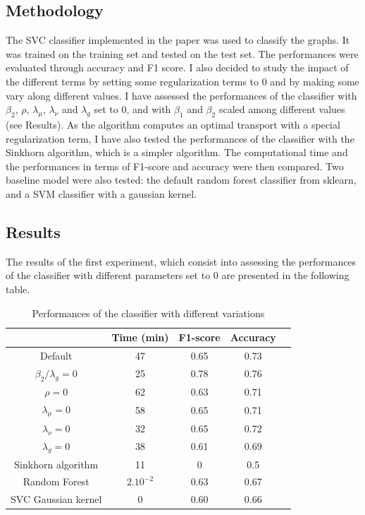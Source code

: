 \documentclass[a4paper,11pt]{article}
\begin{document}
\subsection{Methodology}

The SVC classifier implemented in the paper was used to classify the graphs. 
It was trained on the training set and tested on the test set.
The performances were evaluated through accuracy and F1 score.
I also decided to study the impact of the different terms by setting some regularization terms to 0 and by making some vary along different values. 
I have assessed the performances of the classifier with $\beta_2$, $\rho$, $\lambda_\mu$, $\lambda_\nu$ and $\lambda_g$ set to 0, and with $\beta_1$ and $\beta_2$ scaled among different values (see Results).
As the algorithm computes an optimal transport with a special regularization term, I have also tested the performances of the classifier with the Sinkhorn algorithm, which is a simpler algorithm. 
The computational time and the performances in terms of F1-score and accuracy were then compared. 
Two baseline model were also tested: the default random forest classifier from sklearn, and a SVM classifier with a gaussian kernel.





\subsection{Results}

The results of the first experiment, which consist into assessing the performances of the classifier with different parameters set to 0 are presented in the following table.

\begin{table}[h]
    \centering
    \begin{tabular}{|c|c|c|c|c|}
        \hline
        & Time (min) & F1-score & Accuracy \\
        \hline
        Default & 47 & 0.65 & 0.73 \\
        \hline
        $\beta_2/\lambda_g = 0$ & 25 & 0.78 & 0.76 \\
        \hline
        $\rho = 0$ & 62 & 0.63 & 0.71 \\
        \hline
        $\lambda_\mu = 0$ & 58 & 0.65 & 0.71 \\
        \hline
        $\lambda_\nu = 0 $ & 32 & 0.65 & 0.72 \\
        \hline
        $\lambda_g = 0$ & 38 & 0.61 & 0.69 \\
        \hline
        Sinkhorn algorithm  & 11 & 0 & 0.5 \\
        \hline
        Random Forest &$ 2.10^{-2}$& 0.63 & 0.67\\
        \hline
        SVC Gaussian kernel  &0 &0.60 & 0.66 \\
        \hline
    \end{tabular}
    \caption{Performances of the classifier with different variations}
    \label{tab:results}
\end{table}
\end{document}
